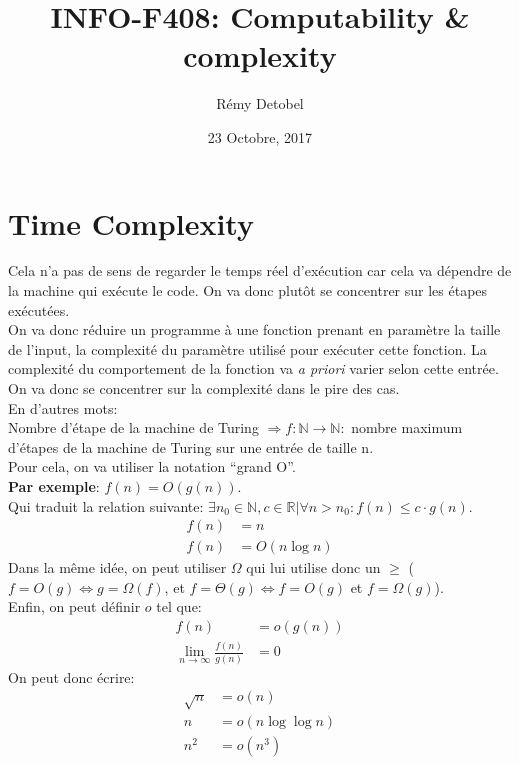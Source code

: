 \documentclass[a4paper,12pt]{article}
\title{INFO-F408: Computability \& complexity}
\date{23 Octobre, 2017}
\author{Rémy Detobel}
\begin{document}
\maketitle
\newpage

\section{Time Complexity}
  Cela n'a pas de sens de regarder le temps réel d'exécution car cela va dépendre de la machine qui exécute le code.  On va donc plutôt se concentrer sur les étapes exécutées.\\
  On va donc réduire un programme à une fonction prenant en paramètre la taille de l'input, la complexité du paramètre utilisé pour exécuter cette fonction.
	La complexité du comportement de la fonction va \textit{a priori} varier selon cette entrée.  On va donc se concentrer sur la complexité dans le pire des cas.\\
  En d'autres mots:\\
  Nombre d'étape de la machine de Turing $\Rightarrow f: \mathbb{N} \rightarrow \mathbb{N} : $ nombre maximum d'étapes de la machine de Turing sur une entrée de taille n.\\
  Pour cela, on va utiliser la notation ``grand O''.\\

  \textbf{Par exemple}: $f(n) = O(g(n))$.\\
  Qui traduit la relation suivante: $\exists n_0 \in \mathbb N, c \in \mathbb R | \forall n > n_0 : f(n) \leq c \cdot g(n)$.\\
  \begin{align*}
    f(n) &= n\\
    f(n) &= O(n \log n)
  \end{align*}
  Dans la même idée, on peut utiliser $\Omega$ qui lui utilise donc un $\geq$ ($f = O(g) \iff g = \Omega(f)$, et $f = \Theta(g) \iff f = O(g)$ et $f = \Omega(g)$).\\

  Enfin, on peut définir $o$ tel que:
  \begin{align*}
   f(n) &= o(g(n))\\
   \lim_{n \rightarrow \infty} \frac{f(n)}{g(n)} &= 0
  \end{align*}
  On peut donc écrire:
  \begin{align*}
   \sqrt{n} &= o(n)\\
   n &= o(n \log \log n)\\
   n^2 &= o(n^3)
  \end{align*}
\end{document}
